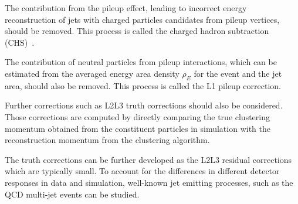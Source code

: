 The contribution from the pileup effect, leading to incorrect energy reconstruction of jets with charged particles candidates from pileup vertices, should be removed.
This process is called the charged hadron subtraction (CHS)~\cite{CMS:2020ebo}.

The contribution of neutral particles from pileup interactions, which can be estimated from the averaged energy area density $\rho_E$ for the event and the jet area, should also be removed.
This process is called the L1 pileup correction.

Further corrections such as L2L3 truth corrections should also be considered.
Those corrections are computed by directly comparing the true clustering momentum obtained from the constituent particles in simulation with the reconstruction momentum from the clustering algorithm.

The truth corrections can be further developed as the L2L3 residual corrections which are typically small.
To account for the differences in different detector responses in data and simulation, well-known jet emitting processes, such as the QCD multi-jet events can be studied.


